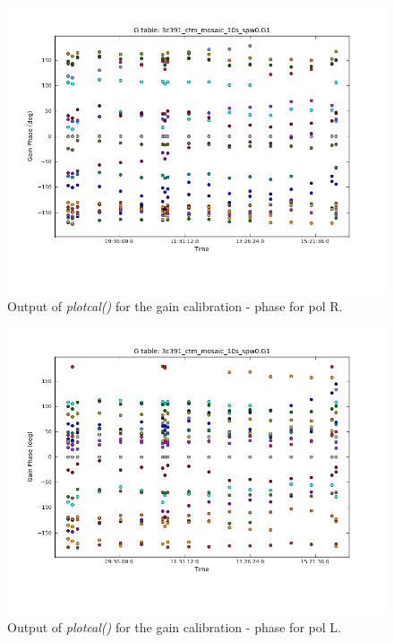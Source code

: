 \documentclass[12pt, a4paper]{article}
\begin{document}
\newpage
\begin{figure}[h!]
    \centering
    \includegraphics[scale=0.5]{../Imaging/plots/part4-subF-question4_phase_pol-R.png}
    \caption{Output of \emph{plotcal()} for the gain calibration - phase for pol R. \label{fig:part4subF-phase-R}}
\end{figure}
\begin{figure}[h!]
    \centering
    \includegraphics[scale=0.5]{../Imaging/plots/part4-subF-question4_phase_pol-L.png}
    \caption{Output of \emph{plotcal()} for the gain calibration - phase for pol L. \label{fig:part4subF-phase-L}}
\end{figure}
\newpage
\end{document}
